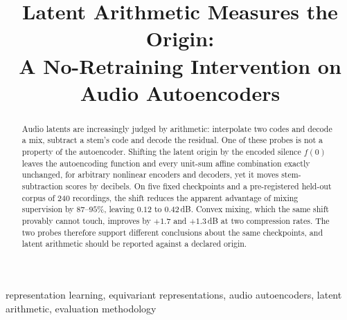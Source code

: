 \documentclass[conference]{IEEEtran}
\begin{document}
\title{Latent Arithmetic Measures the Origin:\\A No-Retraining Intervention on Audio Autoencoders}

\author{
}

\maketitle

\begin{abstract}
Audio latents are increasingly judged by arithmetic: interpolate two codes
and decode a mix, subtract a stem's code and decode the residual. One of
these probes is not a property of the autoencoder. Shifting the latent
origin by the encoded silence $f(0)$ leaves the autoencoding function and
every unit-sum affine combination exactly unchanged, for arbitrary nonlinear
encoders and decoders, yet it moves stem-subtraction scores by decibels. On
five fixed checkpoints and a pre-registered held-out corpus of 240
recordings, the shift reduces the apparent advantage of mixing supervision
by $87$--$95$\%, leaving $0.12$ to $0.42$\,dB. Convex mixing, which the same
shift provably cannot touch, improves by $+1.7$ and $+1.3$\,dB at two
compression rates. The two probes therefore support different conclusions
about the same checkpoints, and latent arithmetic should be reported against
a declared origin.
\end{abstract}

\begin{IEEEkeywords}
representation learning, equivariant representations, audio autoencoders,
latent arithmetic, evaluation methodology
\end{IEEEkeywords}
\end{document}
